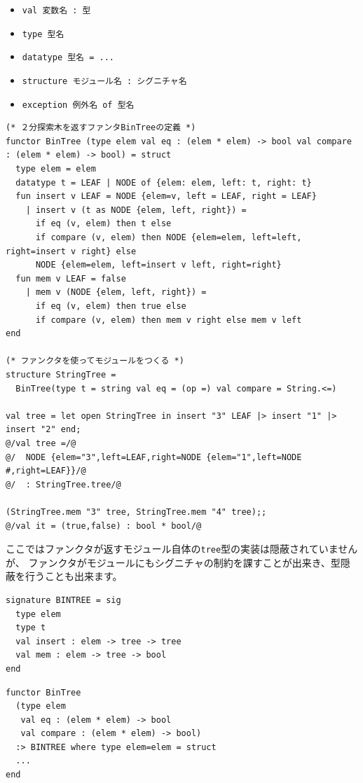 \documentclass[11pt,a4paper]{article}
\begin{document}
\begin{itemize}
\item \lstinline{val 変数名 : 型}
\item \lstinline{type 型名}
\item \lstinline{datatype 型名 = ...}
\item \lstinline{structure モジュール名 : シグニチャ名}
\item \lstinline{exception 例外名 of 型名}
\end{itemize}
\begin{lstlisting}[caption=ファンクタの例]
(* ２分探索木を返すファンタBinTreeの定義 *)
functor BinTree (type elem val eq : (elem * elem) -> bool val compare : (elem * elem) -> bool) = struct
  type elem = elem
  datatype t = LEAF | NODE of {elem: elem, left: t, right: t}
  fun insert v LEAF = NODE {elem=v, left = LEAF, right = LEAF}
    | insert v (t as NODE {elem, left, right}) =
      if eq (v, elem) then t else
      if compare (v, elem) then NODE {elem=elem, left=left, right=insert v right} else
      NODE {elem=elem, left=insert v left, right=right}
  fun mem v LEAF = false
    | mem v (NODE {elem, left, right}) =
      if eq (v, elem) then true else
      if compare (v, elem) then mem v right else mem v left
end

(* ファンクタを使ってモジュールをつくる *)
structure StringTree =
  BinTree(type t = string val eq = (op =) val compare = String.<=)

val tree = let open StringTree in insert "3" LEAF |> insert "1" |> insert "2" end;
@/val tree =/@
@/  NODE {elem="3",left=LEAF,right=NODE {elem="1",left=NODE #,right=LEAF}}/@
@/  : StringTree.tree/@

(StringTree.mem "3" tree, StringTree.mem "4" tree);;
@/val it = (true,false) : bool * bool/@
\end{lstlisting}

ここではファンクタが返すモジュール自体の\lstinline{tree}型の実装は隠蔽されていませんが、
ファンクタがモジュールにもシグニチャの制約を課すことが出来き、型隠蔽を行うことも出来ます。

\begin{minipage}[htb]{0.45\textwidth}
\begin{lstlisting}[caption=２分木のシグニチャ]
signature BINTREE = sig
  type elem
  type t
  val insert : elem -> tree -> tree
  val mem : elem -> tree -> bool
end
\end{lstlisting}
\end{minipage}
\hfill
\begin{minipage}[htb]{0.55\textwidth}
\begin{lstlisting}[caption=BinTreeの再定義,label=code:bin-tree-with-sig]
functor BinTree
  (type elem
   val eq : (elem * elem) -> bool
   val compare : (elem * elem) -> bool)
  :> BINTREE where type elem=elem = struct
  ...
end
\end{lstlisting}
\end{minipage}
\end{document}
